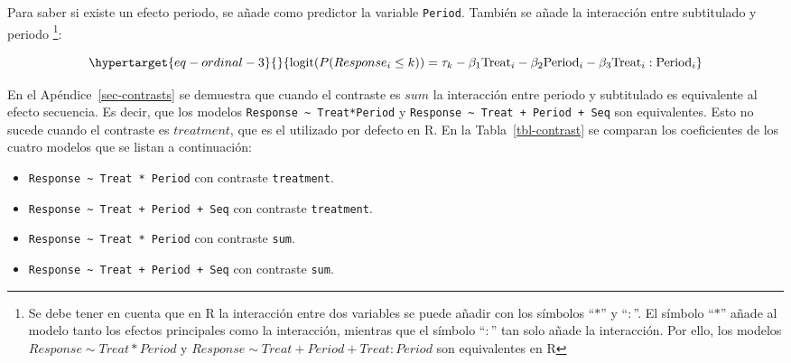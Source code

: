 \documentclass[
  12pt,
  a4paper,
  extrafontsizes,
  onecolumn,
  openright,
  table]{memoir}
\providecommand{\tightlist}{%
  \setlength{\itemsep}{0pt}\setlength{\parskip}{0pt}}\usepackage{longtable,booktabs,array}
\begin{document}
Para saber si existe un efecto periodo, se añade como predictor la
variable \texttt{Period}. También se añade la interacción entre
subtitulado y periodo \footnote{Se debe tener en cuenta que en R la
  interacción entre dos variables se puede añadir con los símbolos
  \enquote{\(*\)} y \enquote{\(:\)}. El símbolo \enquote{\(*\)} añade al
  modelo tanto los efectos principales como la interacción, mientras que
  el símbolo \enquote{\(:\)} tan solo añade la interacción. Por ello,
  los modelos \(Response \sim Treat*Period\) y
  \(Response \sim Treat + Period + Treat:Period\) son equivalentes en R}:

\small

\begin{equation}\protect\hypertarget{eq-ordinal-3}{}{
\text{logit}(P(Response_i \leq k)) = \tau_k - \beta_1 \text{Treat}_i - \beta_2 \text{Period}_i - \beta_3 \text{Treat}_i : \text{Period}_i
}\label{eq-ordinal-3}\end{equation}

\normalsize

En el Apéndice~\ref{sec-contrasts} se demuestra que cuando el contraste
es \(sum\) la interacción entre periodo y subtitulado es equivalente al
\gls{efecto secuencia}. Es decir, que los modelos
\texttt{Response\ \textasciitilde{}\ Treat*Period} y
\texttt{Response\ \textasciitilde{}\ Treat\ +\ Period\ +\ Seq} son
equivalentes. Esto no sucede cuando el contraste es \(treatment\), que
es el utilizado por defecto en R. En la Tabla~\ref{tbl-contrast} se
comparan los coeficientes de los cuatro modelos que se listan a
continuación:

\begin{itemize}
\tightlist
\item
  \texttt{Response\ \textasciitilde{}\ Treat\ *\ Period} con contraste
  \texttt{treatment}.
\item
  \texttt{Response\ \textasciitilde{}\ Treat\ +\ Period\ +\ Seq} con
  contraste \texttt{treatment}.
\item
  \texttt{Response\ \textasciitilde{}\ Treat\ *\ Period} con contraste
  \texttt{sum}.
\item
  \texttt{Response\ \textasciitilde{}\ Treat\ +\ Period\ +\ Seq} con
  contraste \texttt{sum}.
\end{itemize}

\tiny
\end{document}
